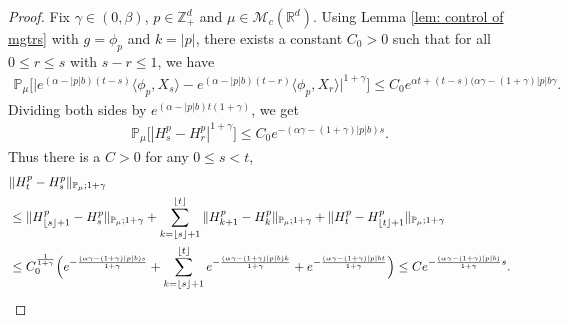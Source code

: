 \documentclass[12pt,a4paper]{amsart}
\theoremstyle{plain}
\theoremstyle{definition}
\numberwithin{equation}{section}
\begin{document}
\begin{proof}
     Fix $\gamma \in (0,\beta)$, $p\in \mathbb{Z}_+^d$ and $\mu\in \mathcal M_c(\mathbb R^d)$.
Using Lemma \ref{lem: control of mgtrs} with $g=\phi_p$ and $k=|p|$,
 there exists a constant $C_0>0$ such that for all $0\leq r\leq s $ with $s-r\leq1$, we have
    \begin{align}
        \mathbb{P}_{\mu}\big[\big|e^{(\alpha-|p|b)(t-s)}\langle\phi_p, X_s\rangle-e^{(\alpha-|p|b)(t-r)}\langle\phi_p, X_r\rangle\big|^{1+\gamma}\big]
        \leq C_0e^{\alpha t+(t-s)(\alpha\gamma-(1+\gamma)|p|b\gamma}.
    \end{align}
    Dividing both sides by $e^{(\alpha-|p|b) t(1+\gamma)}$, we get
    \begin{align}
        \mathbb{P}_{\mu}\big[|H^p_s-H^p_r|^{1+\gamma}\big]\leq  C_0 e^{-(\alpha\gamma-(1+\gamma)|p|b)s}.
    \end{align}
    Thus there is a $C>0$ for any $0\leq s<t$,
\begin{align}
	& \|H^p_t-H^p_s\|_{\mathbb{P}_{\mu};1+\gamma}
	\\&\leq \|H^p_{\lfloor s \rfloor+1}-H^p_s\|_{\mathbb{P}_{\mu};1+\gamma}+\sum_{k=\lfloor s \rfloor+1}^{\lfloor t \rfloor}\|H^p_{k+1}-H^p_{k}\|_{\mathbb{P}_{\mu};1+\gamma}+\|H^p_t-H^p_{\lfloor t \rfloor+1}\|_{\mathbb{P}_{\mu};1+\gamma}
	\\& \leq C_0^{\frac{1}{1+\gamma}} \Big(e^{-\frac{(\alpha \gamma-(1+\gamma)|p|b) s}{1+\gamma}}+\sum_{k=\lfloor s \rfloor+1}^{\lfloor t \rfloor}e^{-\frac{(\alpha \gamma-(1+\gamma)|p|b) k}{1+\gamma}}+ e^{-\frac{(\alpha \gamma-(1+\gamma)|p|b t}{1+\gamma}}\Big)
	\leq Ce^{-\frac{(\alpha \gamma-(1+\gamma)|p|b)}{1+\gamma}s}.
    \qedhere
\end{align}	
\end{proof}
\end{document}
